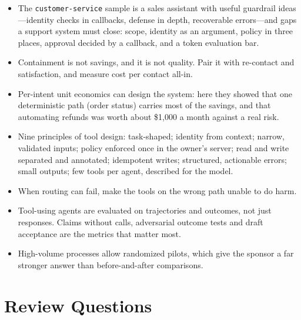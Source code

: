 \begin{itemize}[itemsep=2pt]
  \item The \texttt{customer-service} sample is a sales assistant with useful guardrail ideas---identity checks in callbacks, defense in depth, recoverable errors---and gaps a support system must close: scope, identity as an argument, policy in three places, approval decided by a callback, and a token evaluation bar.
  \item Containment is not savings, and it is not quality. Pair it with re-contact and satisfaction, and measure cost per contact all-in.
  \item Per-intent unit economics can design the system: here they showed that one deterministic path (order status) carries most of the savings, and that automating refunds was worth about \$1{,}000 a month against a real risk.
  \item Nine principles of tool design: task-shaped; identity from context; narrow, validated inputs; policy enforced once in the owner's server; read and write separated and annotated; idempotent writes; structured, actionable errors; small outputs; few tools per agent, described for the model.
  \item When routing can fail, make the tools on the wrong path unable to do harm.
  \item Tool-using agents are evaluated on trajectories and outcomes, not just responses. Claims without calls, adversarial outcome tests and draft acceptance are the metrics that matter most.
  \item High-volume processes allow randomized pilots, which give the sponsor a far stronger answer than before-and-after comparisons.
\end{itemize}

\section*{Review Questions}

